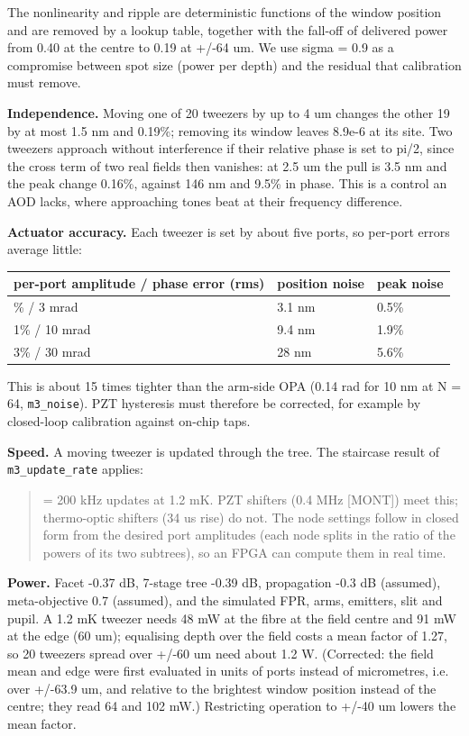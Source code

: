 The nonlinearity and ripple are deterministic functions of the window
position and are removed by a lookup table, together with the fall-off
of delivered power from 0.40 at the centre to 0.19 at +/-64 um. We use
sigma = 0.9 as a compromise between spot size (power per depth) and the
residual that calibration must remove.

\textbf{Independence.} Moving one of 20 tweezers by up to 4 um changes
the other 19 by at most 1.5 nm and 0.19\%; removing its window leaves
8.9e-6 at its site. Two tweezers approach without interference if their
relative phase is set to pi/2, since the cross term of two real fields
then vanishes: at 2.5 um the pull is 3.5 nm and the peak change 0.16\%,
against 146 nm and 9.5\% in phase. This is a control an AOD lacks, where
approaching tones beat at their frequency difference.

\textbf{Actuator accuracy.} Each tweezer is set by about five ports, so
per-port errors average little:

{\small
\begin{longtable}[]{@{}lll@{}}
\toprule\noalign{}
per-port amplitude / phase error (rms) & position noise & peak noise \\
\midrule\noalign{}
\endhead
\bottomrule\noalign{}
\endlastfoot
0.3\% / 3 mrad & 3.1 nm & 0.5\% \\
1\% / 10 mrad & 9.4 nm & 1.9\% \\
3\% / 30 mrad & 28 nm & 5.6\% \\
\end{longtable}
}

This is about 15 times tighter than the arm-side OPA (0.14 rad for 10 nm
at N = 64, \texttt{m3\_noise}). PZT hysteresis must therefore be
corrected, for example by closed-loop calibration against on-chip taps.

\textbf{Speed.} A moving tweezer is updated through the tree. The
staircase result of \texttt{m3\_update\_rate} applies:

\begin{quote}
= 200 kHz updates at 1.2 mK. PZT shifters (0.4 MHz {[}MONT{]}) meet
this; thermo-optic shifters (34 us rise) do not. The node settings
follow in closed form from the desired port amplitudes (each node splits
in the ratio of the powers of its two subtrees), so an FPGA can compute
them in real time.
\end{quote}

\textbf{Power.} Facet -0.37 dB, 7-stage tree -0.39 dB, propagation -0.3
dB (assumed), meta-objective 0.7 (assumed), and the simulated FPR, arms,
emitters, slit and pupil. A 1.2 mK tweezer needs 48 mW at the fibre at
the field centre and 91 mW at the edge (60 um); equalising depth over
the field costs a mean factor of 1.27, so 20 tweezers spread over +/-60
um need about 1.2 W. (Corrected: the field mean and edge were first
evaluated in units of ports instead of micrometres, i.e. over +/-63.9
um, and relative to the brightest window position instead of the centre;
they read 64 and 102 mW.) Restricting operation to +/-40 um lowers the
mean factor.

